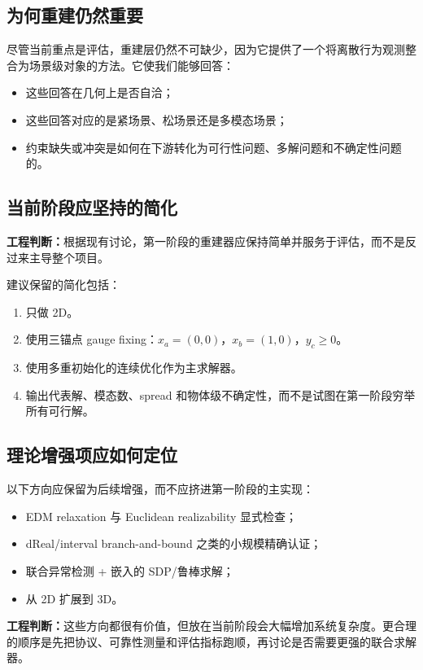 \documentclass[11pt,a4paper]{ctexart}
\newcommand{\engineering}[1]{\textbf{工程判断：}#1}
\begin{document}
\subsection{为何重建仍然重要}

尽管当前重点是评估，重建层仍然不可缺少，因为它提供了一个将离散行为观测整合为场景级对象的方法。它使我们能够回答：
\begin{itemize}
  \item 这些回答在几何上是否自洽；
  \item 这些回答对应的是紧场景、松场景还是多模态场景；
  \item 约束缺失或冲突是如何在下游转化为可行性问题、多解问题和不确定性问题的。
\end{itemize}

\subsection{当前阶段应坚持的简化}

\engineering{根据现有讨论，第一阶段的重建器应保持简单并服务于评估，而不是反过来主导整个项目。}

建议保留的简化包括：
\begin{enumerate}[label=\arabic*.]
  \item 只做 2D。
  \item 使用三锚点 gauge fixing：$x_a=(0,0)$，$x_b=(1,0)$，$y_c \ge 0$。
  \item 使用多重初始化的连续优化作为主求解器。
  \item 输出代表解、模态数、spread 和物体级不确定性，而不是试图在第一阶段穷举所有可行解。
\end{enumerate}

\subsection{理论增强项应如何定位}

以下方向应保留为后续增强，而不应挤进第一阶段的主实现：
\begin{itemize}
  \item EDM relaxation 与 Euclidean realizability 显式检查；
  \item dReal/interval branch-and-bound 之类的小规模精确认证；
  \item 联合异常检测 + 嵌入的 SDP/鲁棒求解；
  \item 从 2D 扩展到 3D。
\end{itemize}

\engineering{这些方向都很有价值，但放在当前阶段会大幅增加系统复杂度。更合理的顺序是先把协议、可靠性测量和评估指标跑顺，再讨论是否需要更强的联合求解器。}
\end{document}
